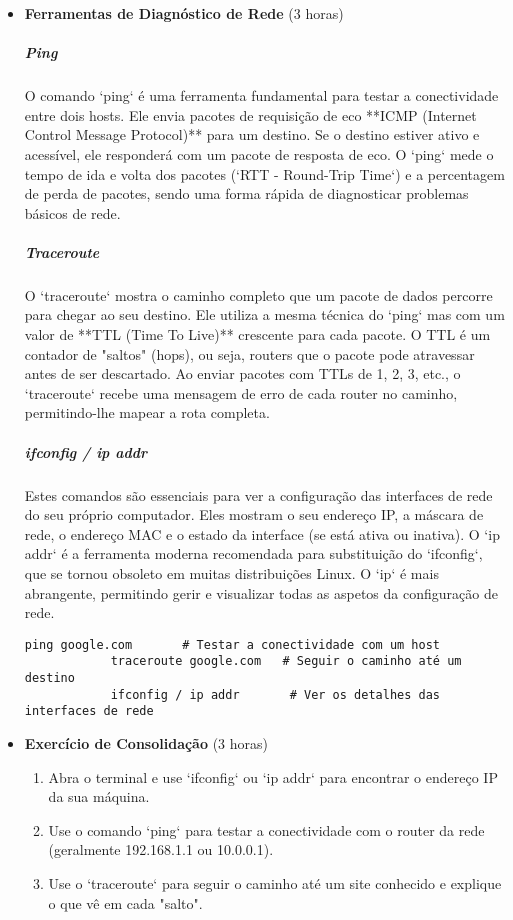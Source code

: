 \documentclass[10pt,a4paper]{article}
\begin{document}
\begin{itemize}
		\begin{lstlisting}[language=, caption=Exemplo de IP e Máscara]
			Endereço IP: 192.168.1.50
			Máscara de Rede: 255.255.255.0  (ou /24)
		\end{lstlisting}
		
		\item \textbf{Ferramentas de Diagnóstico de Rede} (3 horas)
		\subparagraph{Ping} O comando `ping` é uma ferramenta fundamental para testar a conectividade entre dois hosts. Ele envia pacotes de requisição de eco **ICMP (Internet Control Message Protocol)** para um destino. Se o destino estiver ativo e acessível, ele responderá com um pacote de resposta de eco. O `ping` mede o tempo de ida e volta dos pacotes (`RTT - Round-Trip Time`) e a percentagem de perda de pacotes, sendo uma forma rápida de diagnosticar problemas básicos de rede.
		\subparagraph{Traceroute} O `traceroute` mostra o caminho completo que um pacote de dados percorre para chegar ao seu destino. Ele utiliza a mesma técnica do `ping` mas com um valor de **TTL (Time To Live)** crescente para cada pacote. O TTL é um contador de "saltos" (hops), ou seja, routers que o pacote pode atravessar antes de ser descartado. Ao enviar pacotes com TTLs de 1, 2, 3, etc., o `traceroute` recebe uma mensagem de erro de cada router no caminho, permitindo-lhe mapear a rota completa.
		\subparagraph{ifconfig / ip addr} Estes comandos são essenciais para ver a configuração das interfaces de rede do seu próprio computador. Eles mostram o seu endereço IP, a máscara de rede, o endereço MAC e o estado da interface (se está ativa ou inativa). O `ip addr` é a ferramenta moderna recomendada para substituição do `ifconfig`, que se tornou obsoleto em muitas distribuições Linux. O `ip` é mais abrangente, permitindo gerir e visualizar todas as aspetos da configuração de rede.
		
		\begin{lstlisting}[caption=Comandos de Diagnóstico de Rede]
			ping google.com       # Testar a conectividade com um host
			traceroute google.com   # Seguir o caminho até um destino
			ifconfig / ip addr       # Ver os detalhes das interfaces de rede
		\end{lstlisting}
		
		\item \textbf{Exercício de Consolidação} (3 horas)
		\begin{enumerate}
			\item Abra o terminal e use `ifconfig` ou `ip addr` para encontrar o endereço IP da sua máquina.
			\item Use o comando `ping` para testar a conectividade com o router da rede (geralmente 192.168.1.1 ou 10.0.0.1).
			\item Use o `traceroute` para seguir o caminho até um site conhecido e explique o que vê em cada "salto".
		\end{enumerate}
	\end{itemize}
	
\end{document}
